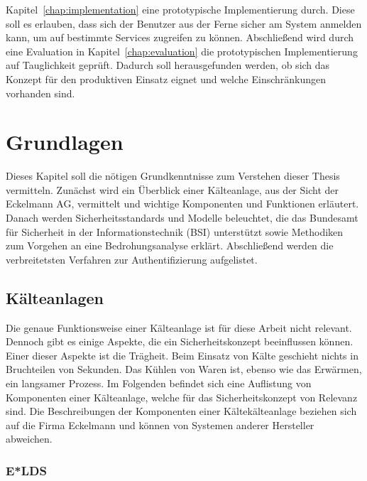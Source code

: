 \documentclass[11pt,a4paper]{report}
\begin{document}
Kapitel~\ref{chap:implementation} eine prototypische Implementierung durch. Diese soll es erlauben, dass sich der Benutzer aus der Ferne sicher am System anmelden kann, um auf bestimmte Services zugreifen zu können. Abschließend wird durch eine Evaluation in Kapitel~\ref{chap:evaluation} die prototypischen Implementierung auf Tauglichkeit geprüft. Dadurch soll herausgefunden werden, ob sich das Konzept für den produktiven Einsatz eignet und welche Einschränkungen vorhanden sind.

\chapter{Grundlagen} \label{chap:basics}

Dieses Kapitel soll die nötigen Grundkenntnisse zum Verstehen dieser Thesis vermitteln. Zunächst wird ein Überblick einer Kälteanlage, aus der Sicht der Eckelmann AG, vermittelt und wichtige Komponenten und Funktionen erläutert. Danach werden Sicherheitsstandards und Modelle beleuchtet, die das Bundesamt für Sicherheit in der Informationstechnik (BSI) unterstützt sowie Methodiken zum Vorgehen an eine Bedrohungsanalyse erklärt. Abschließend werden die verbreitetsten Verfahren zur Authentifizierung aufgelistet.

\section{Kälteanlagen}

Die genaue Funktionsweise einer Kälteanlage ist für diese Arbeit nicht relevant. Dennoch gibt es einige Aspekte, die ein Sicherheitskonzept beeinflussen können. Einer dieser Aspekte ist die Trägheit. Beim Einsatz von Kälte geschieht nichts in Bruchteilen von Sekunden. Das Kühlen von Waren ist, ebenso wie das Erwärmen, ein langsamer Prozess. Im Folgenden befindet sich eine Auflistung von Komponenten einer Kälteanlage, welche für das Sicherheitskonzept von Relevanz sind. Die Beschreibungen der Komponenten einer Kältekälteanlage beziehen sich auf die Firma Eckelmann und können von Systemen anderer Hersteller abweichen.

\subsection{E*LDS}
\end{document}
